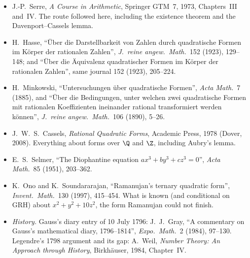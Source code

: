 \begin{itemize}
\item J.-P.~Serre, \emph{A Course in Arithmetic}, Springer GTM~7, 1973, Chapters~III and~IV. The route followed here, including the
existence theorem and the Davenport--Cassels lemma.
\item H.~Hasse, ``\"Uber die Darstellbarkeit von Zahlen durch quadratische Formen im K\"orper der rationalen Zahlen'', \emph{J.\
reine angew.\ Math.}\ 152 (1923), 129--148; and ``\"Uber die \"Aquivalenz quadratischer Formen im K\"orper der rationalen Zahlen'',
same journal 152 (1923), 205--224.
\item H.~Minkowski, ``Untersuchungen \"uber quadratische Formen'', \emph{Acta Math.}\ 7 (1885), and ``\"Uber die Bedingungen, unter
welchen zwei quadratische Formen mit rationalen Koeffizienten ineinander rational transformiert werden k\"onnen'', \emph{J.\ reine
angew.\ Math.}\ 106 (1890), 5--26.
\item J.~W.~S.~Cassels, \emph{Rational Quadratic Forms}, Academic Press, 1978 (Dover, 2008). Everything about forms over $\Q$ and
$\Z$, including Aubry's lemma.
\item E.~S.~Selmer, ``The Diophantine equation $ax^3+by^3+cz^3=0$'', \emph{Acta Math.}\ 85 (1951), 203--362.
\item K.~Ono and K.~Soundararajan, ``Ramanujan's ternary quadratic form'', \emph{Invent.\ Math.}\ 130 (1997), 415--454. What is
known (and conditional on GRH) about $x^2+y^2+10z^2$, the form Ramanujan could not finish.
\item \emph{History.} Gauss's diary entry of 10 July 1796: J.~J.~Gray, ``A commentary on Gauss's mathematical diary,
1796--1814'', \emph{Expo.\ Math.}\ 2 (1984), 97--130. Legendre's 1798 argument and its gap: A.~Weil, \emph{Number Theory: An
Approach through History}, Birkh\"auser, 1984, Chapter~IV.
\end{itemize}
